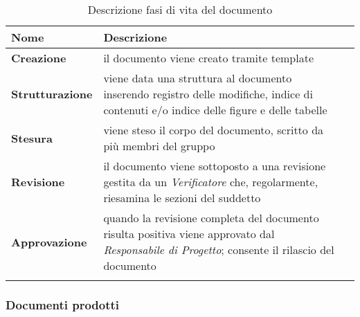 {
	\setlength{\freewidth}{\dimexpr\textwidth-1\tabcolsep}
	\renewcommand{\arraystretch}{1.5}
	\setlength{\aboverulesep}{0pt}
	\setlength{\belowrulesep}{0pt}
	\begin{longtable}{L{.210\freewidth} L{.6\freewidth} L{.080\freewidth}}
		\toprule 
		\textbf{Nome} & \textbf{Descrizione} & \\
		\toprule
		\endhead		
		\textbf{Creazione} & il documento viene creato tramite template \\ 
		\textbf{Strutturazione} & viene data una struttura al documento inserendo registro delle modifiche, indice di contenuti e/o indice delle figure e delle tabelle\\
		\textbf{Stesura} & viene steso il corpo del documento, scritto da più membri del gruppo \\ 
		\textbf{Revisione} & il documento viene sottoposto a una revisione gestita da un \textit{Verificatore} che, regolarmente, riesamina le sezioni del suddetto \\
		\textbf{Approvazione} & quando la revisione completa del documento risulta positiva viene approvato dal \textit{Responsabile di Progetto}; consente il rilascio del documento \\ 	
				
		\bottomrule
		\hiderowcolors
		\caption{Descrizione fasi di vita del documento}
	\end{longtable}

\subsubsection{Documenti prodotti \hfil}

}
